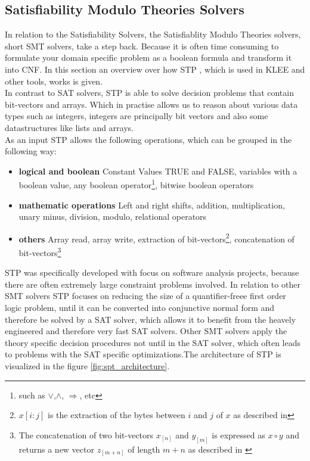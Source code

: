 \subsection{Satisfiability Modulo Theories Solvers}
In relation to the Satisfiability Solvers, the Satisfiablity Modulo Theories solvers, short SMT solvers, take a step back. Because it is often time consuming to formulate your domain specific problem as a boolean formula and transform it into CNF. In this section an overview over how STP \cite{Ganesh:2007:DPB:1770351.1770421}, which is used in KLEE and other tools, works is given.\\
In contrast to SAT solvers, STP is able to solve decision problems that contain bit-vectors and arrays. Which in practise allows us to reason about various data types such as integers, integers are principally bit vectors and also some datastructures like lists and arrays.\\
As an input STP allows the following operations, which can be grouped in the following way:\\
\begin{itemize}
\item \textbf{logical and boolean} Constant Values TRUE and FALSE, variables with a boolean value, any boolean operator\footnote{such as $\lor$,$\land$, $\Rightarrow$, etc}, bitwise boolean operators \\
\item \textbf{mathematic operations} Left and right shifts, addition, multiplication, unary minus, division, modulo, relational operators\\
\item \textbf{others} Array read, array write,  extraction of bit-vectors\footnote{$x[i:j]$ is the extraction of the bytes between $i$ and $j$ of $x$ as described in\cite{Ganesh:2007:DPB:1770351.1770421}}, concatenation of bit-vectors\footnote{The concatenation of two bit-vectors $x_{[n]}$ and $y_{[m]}$ is expressed as $x \circ y$ and returns a new vector $z_{[m+n]}$ of length $m+n$ as described in \cite{Ganesh:2007:DPB:1770351.1770421}} \\
\end{itemize}
STP was specifically developed with focus on software analysis projects, because there are often extremely large constraint problems involved. In relation to other SMT solvers STP focuses on reducing the size of a quantifier-freee first order logic problem, until it can be converted into conjunctive normal form and therefore be solved by a SAT solver, which allows it to benefit from the heavely engineered and therefore very fast SAT solvers. Other SMT solvers apply the theory specific decision procedures not until in the SAT solver, which often leads to problems with the SAT specific optimizations.The architecture of STP is visualized in the figure \ref{fig:spt_architecture}.
